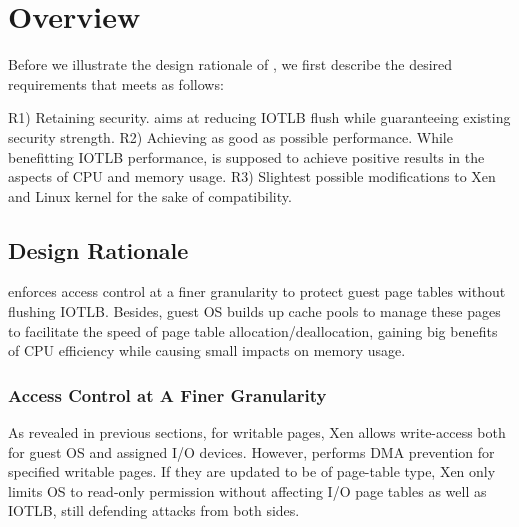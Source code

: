 \section{\name Overview} \label{sec:overview}
Before we illustrate the design rationale of \name, we first describe the desired requirements that \name meets as follows:

R1) Retaining security. \name aims at reducing IOTLB flush while guaranteeing existing security strength.
R2) Achieving as good as possible performance. While benefitting IOTLB performance, \name is supposed to achieve positive results in the aspects of CPU and memory usage.
R3) Slightest possible modifications to Xen and Linux kernel for the sake of compatibility.

\subsection{Design Rationale}
\name enforces access control at a finer granularity to protect guest page tables without flushing IOTLB. Besides, guest OS builds up cache pools to manage these pages to facilitate the speed of page table allocation/deallocation, gaining big benefits of CPU efficiency while causing small impacts on memory usage.

\subsubsection{Access Control at A Finer Granularity}
As revealed in previous sections, for writable pages, Xen allows write-access both for guest OS and assigned I/O devices. However, \name performs DMA prevention for specified writable pages. If they are updated to be of page-table type, Xen only limits OS to read-only permission without affecting I/O page tables as well as IOTLB, still defending attacks from both sides.


